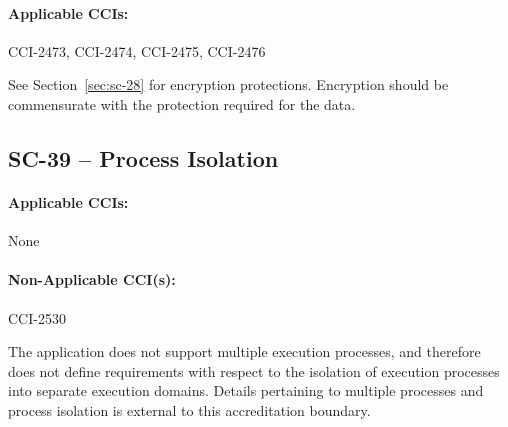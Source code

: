 \documentclass[letterpaper, 10pt, twoside]{article}
\begin{document}
\paragraph{Applicable CCIs:} CCI-2473, CCI-2474, CCI-2475, CCI-2476

See Section~\ref{sec:sc-28} for encryption protections. Encryption should be commensurate with the protection required for the data.

\subsection{SC-39 -- Process Isolation}

\paragraph{Applicable CCIs:} None

\paragraph{Non-Applicable CCI(s):} CCI-2530

The application does not support multiple execution processes, and therefore does not define requirements with respect to the isolation of execution processes into separate execution domains. Details pertaining to multiple processes and process isolation is external to this accreditation boundary.

\clearpage
\printbibliography
\end{document}
